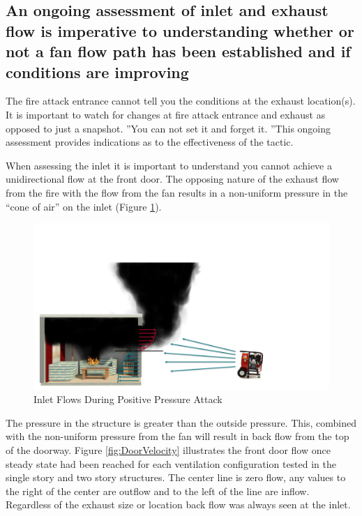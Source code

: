 \documentclass{article}
\begin{document}
\subsection{An ongoing assessment of inlet and exhaust flow is imperative to understanding whether or not a fan flow path has been established and if conditions are improving} \label{sec:OngoingAssessment}
The fire attack entrance cannot tell you the conditions at the exhaust location(s). It is important to watch for changes at fire attack entrance and exhaust as opposed to just a snapshot. ''You can not set it and forget it. ''This ongoing assessment provides indications as to the effectiveness of the tactic. 

When assessing the inlet it is important to understand you cannot achieve a unidirectional flow at the front door. The opposing nature of the exhaust flow from the fire with the flow from the fan results in a non-uniform pressure in the “cone of air” on the inlet (Figure \ref{fig:FanAndDoorFlow}).

\begin{figure}[H]
	\centering
	\includegraphics[width = 6in]{0_Images/Tactical_Considerations/Ongoing_Assessment/FanandDoorFlow.pdf}
	\caption{Inlet Flows During Positive Pressure Attack}
	\label{fig:FanAndDoorFlow}
\end{figure}

The pressure in the structure is greater than the outside pressure. This, combined with the non-uniform pressure from the fan will result in back flow from the top of the doorway. Figure \ref{fig:DoorVelocity} illustrates the front door flow once steady state had been reached for each ventilation configuration tested in the single story and two story structures. The center line is zero flow, any values to the right of the center are outflow and to the left of the line are inflow. Regardless of the exhaust size or location back flow was always seen at the inlet.
\end{document}
